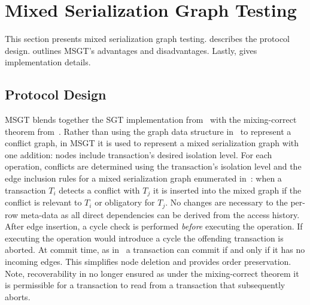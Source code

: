 \section{Mixed Serialization Graph Testing}
\label{sec:msgt}

This section presents mixed serialization graph testing. 
 describes the protocol design.
 outlines MSGT's advantages and disadvantages. 
Lastly,  gives implementation details.

\subsection{Protocol Design}
\label{sec:msgt-description}

MSGT blends together the SGT implementation from~ with the mixing-correct theorem 
from~. Rather than using the graph data structure in~
to represent a conflict graph, in MSGT it is used to represent a mixed serialization graph with one addition: nodes
include transaction's desired isolation level. For each operation, conflicts 
are determined using the transaction's isolation level and the edge inclusion rules for a mixed 
serialization graph enumerated in~: when a transaction $T_i$ detects a conflict with $T_j$ it 
is inserted into the mixed graph if the conflict is relevant to $T_i$ or obligatory for $T_j$. No changes are 
necessary to the per-row meta-data as all direct dependencies can be derived 
from the access history. After edge insertion, a cycle check is performed \emph{before} executing the 
operation. If executing the operation would introduce a cycle the offending transaction is aborted. At commit 
time, as in~\cite{DBLP:conf/icde/Durner019} a transaction can commit if and only if it has no incoming edges. 
This simplifies node deletion and provides order preservation. Note, recoverability in no longer ensured as 
under the mixing-correct theorem it is permissible for a  transaction to read from a
transaction that subsequently aborts.  



